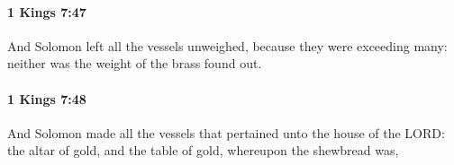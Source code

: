 		\paragraph{1 Kings 7:47} %
			\label{1KINGS-7-47}

			And Solomon left all the vessels unweighed, because they were exceeding many: neither was the weight of the brass found out.


		\paragraph{1 Kings 7:48} %
			\label{1KINGS-7-48}

			And Solomon made all the vessels that pertained unto the house of the LORD: the altar of gold, and the table of gold, whereupon the shewbread was,



